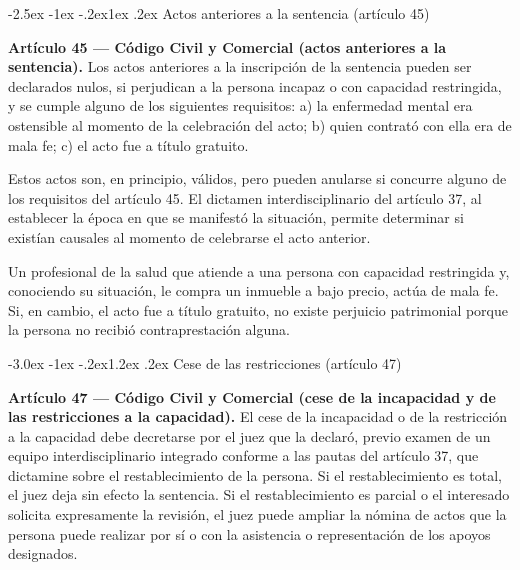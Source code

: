 \documentclass[12pt,oneside]{book}
\makeatletter
\renewcommand\section{\@startsection{section}{1}{\z@}%
  {-3.0ex \@plus -1ex \@minus -.2ex}{1.2ex \@plus .2ex}%
  {\normalfont\large\bfseries\color{acento}}}
\renewcommand\subsection{\@startsection{subsection}{2}{\z@}%
  {-2.5ex \@plus -1ex \@minus -.2ex}{1ex \@plus .2ex}%
  {\normalfont\normalsize\bfseries}}
\makeatother
\begin{document}
\subsection{Actos anteriores a la sentencia (artículo 45)}

\begin{importante}
\textbf{Artículo 45 --- Código Civil y Comercial (actos anteriores a la sentencia).} Los actos anteriores a la inscripción de la sentencia pueden ser declarados nulos, si perjudican a la persona incapaz o con capacidad restringida, y se cumple alguno de los siguientes requisitos: a) la enfermedad mental era ostensible al momento de la celebración del acto; b) quien contrató con ella era de mala fe; c) el acto fue a título gratuito.
\end{importante}

Estos actos son, en principio, válidos, pero pueden anularse si concurre alguno de los requisitos del artículo 45. El dictamen interdisciplinario del artículo 37, al establecer la época en que se manifestó la situación, permite determinar si existían causales al momento de celebrarse el acto anterior.

\begin{ejemplo}
Un profesional de la salud que atiende a una persona con capacidad restringida y, conociendo su situación, le compra un inmueble a bajo precio, actúa de mala fe. Si, en cambio, el acto fue a título gratuito, no existe perjuicio patrimonial porque la persona no recibió contraprestación alguna.
\end{ejemplo}

\section{Cese de las restricciones (artículo 47)}

\begin{importante}
\textbf{Artículo 47 --- Código Civil y Comercial (cese de la incapacidad y de las restricciones a la capacidad).} El cese de la incapacidad o de la restricción a la capacidad debe decretarse por el juez que la declaró, previo examen de un equipo interdisciplinario integrado conforme a las pautas del artículo 37, que dictamine sobre el restablecimiento de la persona. Si el restablecimiento es total, el juez deja sin efecto la sentencia. Si el restablecimiento es parcial o el interesado solicita expresamente la revisión, el juez puede ampliar la nómina de actos que la persona puede realizar por sí o con la asistencia o representación de los apoyos designados.
\end{importante}
\end{document}

